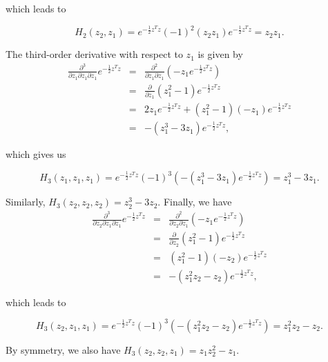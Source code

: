 \documentclass[11pt]{article}
\numberwithin{equation}{section}
\begin{document}
\begin{appendix}
which leads to

\begin{equation}
H_2(z_2, z_1) = e^{-\frac{1}{2} z^T z} (-1)^2 (z_2 z_1 ) e^{-\frac{1}{2} z^T z} = z_2 z_1.
\end{equation}

The third-order derivative with respect to $z_1$ is given by
\begin{eqnarray*}
\frac{\partial^3}{\partial z_1 \partial z_1 \partial z_1} e^{-\frac{1}{2} z^T z} & = & \frac{\partial^2}{\partial z_1 \partial z_1} \left( -z_1 e^{-\frac{1}{2} z^T z} \right) \nonumber \\
& = & \frac{\partial}{\partial z_1} \left( z_1^2 - 1 \right) e^{-\frac{1}{2} z^T z} \nonumber \\
& = & 2 z_1 e^{-\frac{1}{2} z^T z} + (z_1^2 - 1) (-z_1) e^{-\frac{1}{2} z^T z} \nonumber \\
& = & -( z_1^3 - 3 z_1) e^{-\frac{1}{2} z^T z},
\end{eqnarray*}

which gives us

\begin{equation}
H_3(z_1, z_1, z_1) = e^{-\frac{1}{2} z^T z} (-1)^3 \left( -( z_1^3 - 3 z_1) e^{-\frac{1}{2} z^T z} \right) = z_1^3 - 3 z_1.
\end{equation}

Similarly, $H_3(z_2, z_2, z_2) = z_2^3 - 3 z_2$. Finally, we have
\begin{eqnarray*}
\frac{\partial^3}{\partial z_2 \partial z_1 \partial z_1} e^{-\frac{1}{2} z^T z} & = & \frac{\partial^2}{\partial z_2 \partial z_1} \left( -z_1 e^{-\frac{1}{2} z^T z} \right) \nonumber \\
& = & \frac{\partial}{\partial z_2} \left( z_1^2 - 1 \right) e^{-\frac{1}{2} z^T z} \nonumber \\
& = & (z_1^2 - 1) (-z_2) e^{-\frac{1}{2} z^T z} \nonumber \\
& = & -( z_1^2 z_2 - z_2) e^{-\frac{1}{2} z^T z},
\end{eqnarray*}

which leads to

\begin{equation}
H_3(z_2, z_1, z_1) = e^{-\frac{1}{2} z^T z} (-1)^3 \left( -(z_1^2 z_2 - z_2) e^{-\frac{1}{2} z^T z} \right) = z_1^2 z_2 - z_2.
\end{equation}

By symmetry, we also have $H_3(z_2, z_2, z_1) = z_1 z_2^2 - z_1$.

\


\end{appendix}
\end{document}
